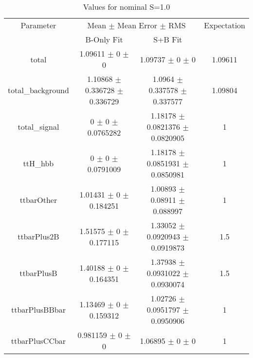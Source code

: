 \begin{table}
\centering
\caption{Values for nominal S=1.0}
\begin{tabular}{cccc}
\toprule
Parameter & \multicolumn{2}{c}{Mean $\pm$ Mean Error $\pm$ RMS} & Expectation\\
 & B-Only Fit & S+B Fit & \\
\midrule
total & \num{1.09611} $\pm$ \num{0} $\pm$ \num{0} & \num{1.09737} $\pm$ \num{0} $\pm$ \num{0} & \num{1.09611}\\
total\_background & \num{1.10868} $\pm$ \num{0.336728} $\pm$ \num{0.336729} & \num{1.0964} $\pm$ \num{0.337578} $\pm$ \num{0.337577} & \num{1.09804}\\
total\_signal & \num{0} $\pm$ \num{0} $\pm$ \num{0.0765282} & \num{1.18178} $\pm$ \num{0.0821376} $\pm$ \num{0.0820905} & \num{1}\\
ttH\_hbb & \num{0} $\pm$ \num{0} $\pm$ \num{0.0791009} & \num{1.18178} $\pm$ \num{0.0851931} $\pm$ \num{0.0850981} & \num{1}\\
ttbarOther & \num{1.01431} $\pm$ \num{0} $\pm$ \num{0.184251} & \num{1.00893} $\pm$ \num{0.08911} $\pm$ \num{0.088997} & \num{1}\\
ttbarPlus2B & \num{1.51575} $\pm$ \num{0} $\pm$ \num{0.177115} & \num{1.33052} $\pm$ \num{0.0920943} $\pm$ \num{0.0919873} & \num{1.5}\\
ttbarPlusB & \num{1.40188} $\pm$ \num{0} $\pm$ \num{0.164351} & \num{1.37938} $\pm$ \num{0.0931022} $\pm$ \num{0.0930074} & \num{1.5}\\
ttbarPlusBBbar & \num{1.13469} $\pm$ \num{0} $\pm$ \num{0.159312} & \num{1.02726} $\pm$ \num{0.0951797} $\pm$ \num{0.0950906} & \num{1}\\
ttbarPlusCCbar & \num{0.981159} $\pm$ \num{0} $\pm$ \num{0} & \num{1.06895} $\pm$ \num{0} $\pm$ \num{0} & \num{1}\\
\bottomrule
\end{tabular}
\end{table}